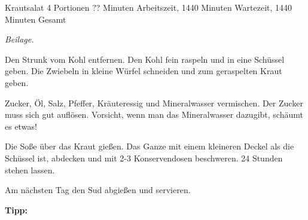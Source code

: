 \begin{recipe}{Krautsalat} {4 Portionen} {?? Minuten Arbeitszeit, 1440 Minuten Wartezeit, 1440 Minuten Gesamt}

  \freeform
  \textit{Beilage.}


  Den Strunk vom Kohl entfernen.
  Den Kohl fein raspeln und in eine Schüssel geben.
  Die Zwiebeln in kleine Würfel schneiden und zum geraspelten Kraut geben.

  \newstep
  Zucker, Öl, Salz, Pfeffer, Kräuteressig und Mineralwasser vermischen.
  Der Zucker muss sich gut auflösen.
  Vorsicht, wenn man das Mineralwasser dazugibt, schäumt es etwas!

  \newstep
  Die Soße über das Kraut gießen.
  Das Ganze mit einem kleineren Deckel als die Schüssel ist, abdecken und mit 2-3 Konservendosen beschweren.
  24 Stunden stehen lassen.

  \newstep
  Am nächsten Tag den Sud abgießen und servieren.


  \freeform
  \hrulefill

  \freeform
  \textbf{Tipp:}

\end{recipe}
